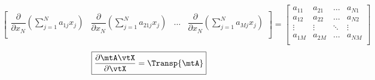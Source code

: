 \begin{frame}
\begin{itemize}
{\begin{align*}
\begin{bmatrix}
				\displaystyle \dfrac{\partial}{\partial x_N} \left( \sum_{j = 1}^N a_{1j}x_j \right) & 
				\displaystyle \dfrac{\partial}{\partial x_N} \left( \sum_{j = 1}^N a_{21j}x_j \right) & 
				\dots & 
				\displaystyle \dfrac{\partial}{\partial x_N} \left( \sum_{j = 1}^N a_{Mj}x_j \right) \\
			\end{bmatrix} 
			= \begin{bmatrix}
				a_{11} & a_{21} & \dots & a_{N1} \\
				a_{12} & a_{22} & \dots & a_{N2} \\
				\vdots & \vdots & \ddots & \vdots \\
				a_{1M} & a_{2M} & \dots & a_{NM} \\
			\end{bmatrix}			
		\end{align*}}
		\[
			\boxed{\frac{\partial \mtA \vtX}{\partial \vtX} = \Transp{\mtA}}
		\]
	\end{itemize}
\end{frame}

